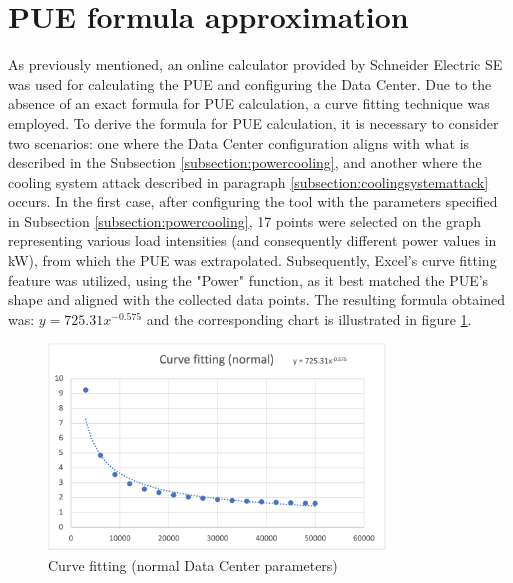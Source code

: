 \section{PUE formula approximation}
As previously mentioned, an online calculator provided by Schneider Electric SE was used for calculating the PUE and configuring the Data Center. Due to the absence of an exact formula for PUE calculation, a curve fitting technique was employed. To derive the formula for PUE calculation, it is necessary to consider two scenarios: one where the Data Center configuration aligns with what is described in the Subsection \ref{subsection:powercooling}, and another where the cooling system attack described in paragraph \ref{subsection:coolingsystemattack} occurs. In the first case, after configuring the tool with the parameters specified in Subsection \ref{subsection:powercooling}, 17 points were selected on the graph representing various load intensities (and consequently different power values in kW), from which the PUE was extrapolated. Subsequently, Excel's curve fitting feature was utilized, using the "Power" function, as it best matched the PUE's shape and aligned with the collected data points. The resulting formula obtained was: \(y = 725.31x^{-0.575}\) and the corresponding chart is illustrated in figure \ref{fig:curve_fitting_normal}. 
\begin{figure}[h]
    \centering
    \includegraphics[width=0.8\textwidth]{chapters/images/curve_fitting_normal.png}
    \caption{Curve fitting (normal Data Center parameters)}
    \label{fig:curve_fitting_normal}
\end{figure}



